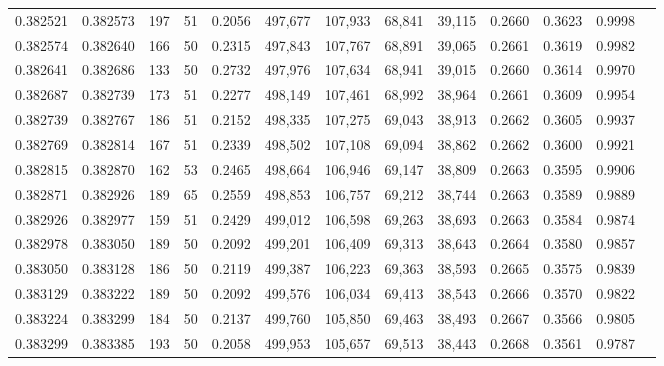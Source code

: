 \begin{tabular}{rrrrrrrrrrrrr}
0.382521 & 0.382573 &   197 &  51 &                                     0.2056 & 497,677 & 107,933 &  68,841 &  39,115 & 0.2660 & 0.3623 & 0.9998 \\
0.382574 & 0.382640 &   166 &  50 &                                     0.2315 & 497,843 & 107,767 &  68,891 &  39,065 & 0.2661 & 0.3619 & 0.9982 \\
0.382641 & 0.382686 &   133 &  50 &                                     0.2732 & 497,976 & 107,634 &  68,941 &  39,015 & 0.2660 & 0.3614 & 0.9970 \\
0.382687 & 0.382739 &   173 &  51 &                                     0.2277 & 498,149 & 107,461 &  68,992 &  38,964 & 0.2661 & 0.3609 & 0.9954 \\
0.382739 & 0.382767 &   186 &  51 &                                     0.2152 & 498,335 & 107,275 &  69,043 &  38,913 & 0.2662 & 0.3605 & 0.9937 \\
0.382769 & 0.382814 &   167 &  51 &                                     0.2339 & 498,502 & 107,108 &  69,094 &  38,862 & 0.2662 & 0.3600 & 0.9921 \\
0.382815 & 0.382870 &   162 &  53 &                                     0.2465 & 498,664 & 106,946 &  69,147 &  38,809 & 0.2663 & 0.3595 & 0.9906 \\
0.382871 & 0.382926 &   189 &  65 &                                     0.2559 & 498,853 & 106,757 &  69,212 &  38,744 & 0.2663 & 0.3589 & 0.9889 \\
0.382926 & 0.382977 &   159 &  51 &                                     0.2429 & 499,012 & 106,598 &  69,263 &  38,693 & 0.2663 & 0.3584 & 0.9874 \\
0.382978 & 0.383050 &   189 &  50 &                                     0.2092 & 499,201 & 106,409 &  69,313 &  38,643 & 0.2664 & 0.3580 & 0.9857 \\
0.383050 & 0.383128 &   186 &  50 &                                     0.2119 & 499,387 & 106,223 &  69,363 &  38,593 & 0.2665 & 0.3575 & 0.9839 \\
0.383129 & 0.383222 &   189 &  50 &                                     0.2092 & 499,576 & 106,034 &  69,413 &  38,543 & 0.2666 & 0.3570 & 0.9822 \\
0.383224 & 0.383299 &   184 &  50 &                                     0.2137 & 499,760 & 105,850 &  69,463 &  38,493 & 0.2667 & 0.3566 & 0.9805 \\
0.383299 & 0.383385 &   193 &  50 &                                     0.2058 & 499,953 & 105,657 &  69,513 &  38,443 & 0.2668 & 0.3561 & 0.9787 \\

\end{tabular}
